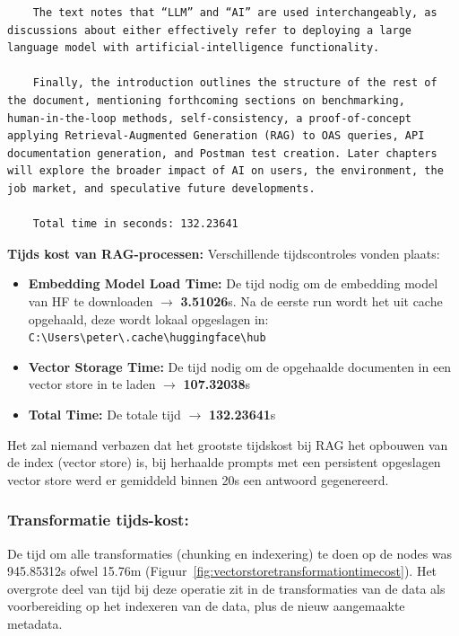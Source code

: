 \begin{verbatim}
    The text notes that “LLM” and “AI” are used interchangeably, as discussions about either effectively refer to deploying a large language model with artificial‑intelligence functionality.
    
    Finally, the introduction outlines the structure of the rest of the document, mentioning forthcoming sections on benchmarking, human‑in‑the‑loop methods, self‑consistency, a proof‑of‑concept applying Retrieval‑Augmented Generation (RAG) to OAS queries, API documentation generation, and Postman test creation. Later chapters will explore the broader impact of AI on users, the environment, the job market, and speculative future developments.
    
    Total time in seconds: 132.23641 
\end{verbatim}

\textbf{Tijds kost van RAG-processen:} Verschillende tijdscontroles vonden plaats:

\begin{itemize}
    \item \textbf{Embedding Model Load Time:} De tijd nodig om de embedding model van HF te downloaden $\rightarrow$ \textbf{3.51026}s. Na de eerste run wordt het uit cache opgehaald, deze wordt lokaal opgeslagen in: \verb|C:\Users\peter\.cache\huggingface\hub|
    \item \textbf{Vector Storage Time:} De tijd nodig om de opgehaalde documenten in een vector store in te laden $\rightarrow$ \textbf{107.32038}s
    \item \textbf{Total Time:} De totale tijd $\rightarrow$ \textbf{132.23641}s
\end{itemize}

Het zal niemand verbazen dat het grootste tijdskost bij RAG het opbouwen van de index (vector store) is, bij herhaalde prompts met een persistent opgeslagen vector store werd er gemiddeld binnen 20s een antwoord gegenereerd.

\subsubsection{Transformatie tijds-kost:}
\label{sssec:transformatietijdskost}
De tijd om alle transformaties (chunking en indexering) te doen op de nodes was 945.85312s ofwel 15.76m (Figuur~\ref{fig:vectorstoretransformationtimecost}). Het overgrote deel van tijd bij deze operatie zit in de transformaties van de data als voorbereiding op het indexeren van de data, plus de nieuw aangemaakte metadata.

